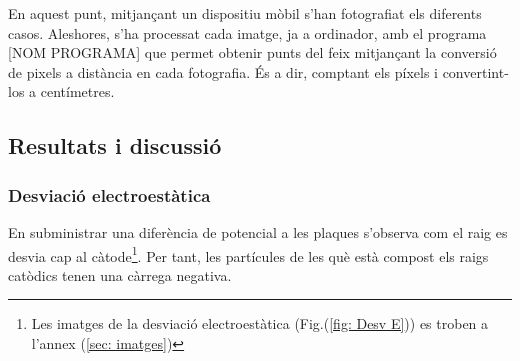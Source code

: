 \documentclass[11pt]{article}
\numberwithin{equation}{section}
\numberwithin{figure}{section}
\numberwithin{table}{section}
\begin{document}
En aquest punt, mitjançant un dispositiu mòbil s'han fotografiat els diferents casos. Aleshores, s'ha processat cada imatge, ja a ordinador, amb el programa [NOM PROGRAMA] que permet obtenir punts del feix mitjançant la conversió de pixels a distància en cada fotografia. És a dir, comptant els píxels i convertint-los a centímetres. 




\newpage
\subsection{Resultats i discussió}

\subsubsection{Desviació electroestàtica}\label{sec: desv_electr}

En subministrar una diferència de potencial a les plaques s'observa com el raig es desvia cap al càtode\footnote{Les imatges de la desviació electroestàtica (Fig.(\ref{fig: Desv E})) es troben a l'annex (\ref{sec: imatges}) }. Per tant, les partícules de les què està compost els raigs catòdics tenen una càrrega negativa.
\end{document}
